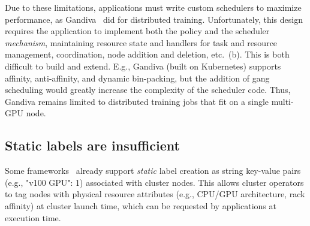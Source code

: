 Due to these limitations, applications must write custom schedulers to maximize performance, as Gandiva~\cite{gandiva} did for distributed training.
Unfortunately, this design requires the application to implement both the policy and the scheduler \emph{mechanism}, maintaining resource state and handlers for task and resource management, coordination, node addition and deletion, etc.~(b).
This is both difficult to build and extend.
E.g., Gandiva (built on Kubernetes) supports affinity, anti-affinity, and dynamic bin-packing, but the addition of gang scheduling would greatly increase the complexity of the scheduler code.
Thus, Gandiva remains limited to distributed training jobs that fit on a single multi-GPU node.


\subsection{Static labels are insufficient}
\label{sec:motivation:label}
Some frameworks~\cite{mesos,omega,yarn,kubernetes} already support \emph{static} label creation as string key-value pairs (e.g., "v100 GPU": 1) associated with cluster nodes.
This allows cluster operators to tag nodes with physical resource attributes (e.g., CPU/GPU architecture, rack affinity) at cluster launch time, which can be requested by applications at execution time.

